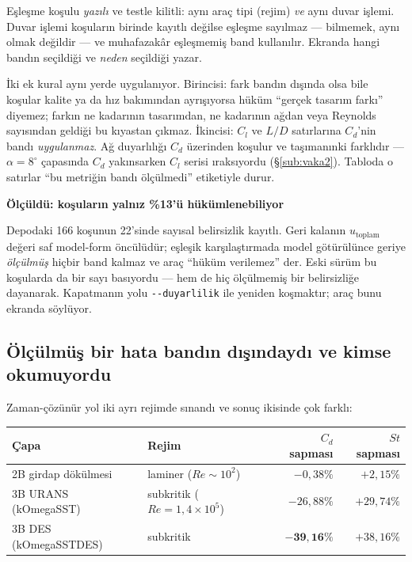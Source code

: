 \documentclass[11pt,a4paper]{article}
\newcommand{\kkkenar}{lacivert}
\newcommand{\kkzemin}{kod}
\newenvironment{renkkutu}[3]{%
  \renewcommand{\kkkenar}{#1}\renewcommand{\kkzemin}{#2}%
  \par\medskip\noindent
  \begin{lrbox}{\kutugovde}%
  \begin{minipage}{\dimexpr\linewidth-2\fboxsep-2\fboxrule\relax}\footnotesize
  \textcolor{#1}{\textbf{#3}}\par\vspace{3pt}%
}{%
  \end{minipage}%
  \end{lrbox}%
  \noindent\fcolorbox{\kkkenar}{\kkzemin}{\usebox{\kutugovde}}%
  \par\medskip
}
\newenvironment{dikkat}[1]{\begin{renkkutu}{orta}{ortabg}{#1}}{\end{renkkutu}}
\begin{document}
\noindent Eşleşme koşulu \emph{yazılı} ve testle kilitli: aynı araç tipi
(rejim) \emph{ve} aynı duvar işlemi. Duvar işlemi koşuların birinde kayıtlı
değilse eşleşme sayılmaz --- bilmemek, aynı olmak değildir --- ve muhafazakâr
eşleşmemiş band kullanılır. Ekranda hangi bandın seçildiği ve \emph{neden}
seçildiği yazar.

İki ek kural aynı yerde uygulanıyor. Birincisi: fark bandın dışında olsa bile
koşular kalite ya da hız bakımından ayrışıyorsa hüküm ``gerçek tasarım farkı''
diyemez; farkın ne kadarının tasarımdan, ne kadarının ağdan veya Reynolds
sayısından geldiği bu kıyastan çıkmaz. İkincisi: $C_l$ ve $L/D$ satırlarına
$C_d$'nin bandı \emph{uygulanmaz}. Ağ duyarlılığı $C_d$ üzerinden koşulur ve
taşımanınki farklıdır --- $\alpha{=}8^\circ$ çapasında $C_d$ yakınsarken $C_l$
serisi ıraksıyordu (\S\ref{sub:vaka2}). Tabloda o satırlar ``bu metriğin bandı
ölçülmedi'' etiketiyle durur.

\begin{dikkat}{Ölçüldü: koşuların yalnız \%13'ü hükümlenebiliyor}
Depodaki 166 koşunun 22'sinde sayısal belirsizlik kayıtlı. Geri kalanın
$u_{\text{toplam}}$ değeri saf model-form öncülüdür; eşleşik karşılaştırmada
model götürülünce geriye \emph{ölçülmüş} hiçbir band kalmaz ve araç ``hüküm
verilemez'' der. Eski sürüm bu koşularda da bir sayı basıyordu --- hem de hiç
ölçülmemiş bir belirsizliğe dayanarak. Kapatmanın yolu \texttt{-{}-duyarlilik}
ile yeniden koşmaktır; araç bunu ekranda söylüyor.
\end{dikkat}

\subsection{Ölçülmüş bir hata bandın dışındaydı ve kimse okumuyordu}
\label{sub:subkritik}

Zaman-çözünür yol iki ayrı rejimde sınandı ve sonuç ikisinde çok farklı:

\begin{center}\footnotesize
\begin{tabular}{@{}llrr@{}}
\toprule
Çapa & Rejim & $C_d$ sapması & $St$ sapması \\
\midrule
2B girdap dökülmesi & laminer ($Re\!\sim\!10^2$) & $-0{,}38\%$ & $+2{,}15\%$ \\
3B URANS (kOmegaSST) & subkritik ($Re\!=\!1{,}4\!\times\!10^5$) & $-26{,}88\%$ & $+29{,}74\%$ \\
3B DES (kOmegaSSTDES) & subkritik & $\mathbf{-39{,}16\%}$ & $+38{,}16\%$ \\
\bottomrule
\end{tabular}
\end{center}
\end{document}
